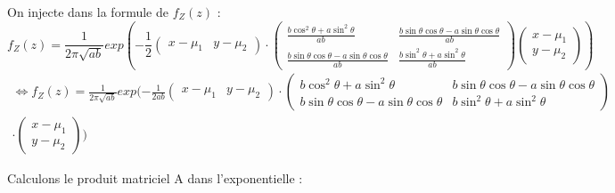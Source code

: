 \documentclass{article}
\begin{document}
On injecte dans la formule de $f_Z(z)$ :
$$f_Z(z) = \frac{1}{2\pi \sqrt{ab}}exp(-\frac{1}{2}\begin{pmatrix}x-\mu_1 & y-\mu_2 \end{pmatrix}\cdot\begin{pmatrix} \frac{b\cos^{2} \theta + a\sin^{2} \theta}{ab} & \frac{b\sin \theta\cos \theta - a\sin \theta\cos \theta}{ab} \\ \frac{b\sin \theta\cos \theta - a\sin \theta\cos \theta}{ab} & \frac{b\sin^{2} \theta + a\sin^{2} \theta}{ab}\end{pmatrix}\begin{pmatrix}x-\mu_1 \\ y-\mu_2 \end{pmatrix})$$
\begin{multline*}\Leftrightarrow f_Z(z) = \frac{1}{2\pi \sqrt{ab}}exp(-\frac{1}{2ab}\begin{pmatrix}x-\mu_1 & y-\mu_2 \end{pmatrix}\cdot\begin{pmatrix} b\cos^{2} \theta + a\sin^{2} \theta & b\sin \theta\cos \theta - a\sin \theta\cos \theta \\ b\sin \theta\cos \theta - a\sin \theta\cos \theta & b\sin^{2} \theta + a\sin^{2} \theta\end{pmatrix}\\\cdot \begin{pmatrix}x-\mu_1 \\ y-\mu_2 \end{pmatrix})\end{multline*}

Calculons le produit matriciel A dans l'exponentielle :
\end{document}
